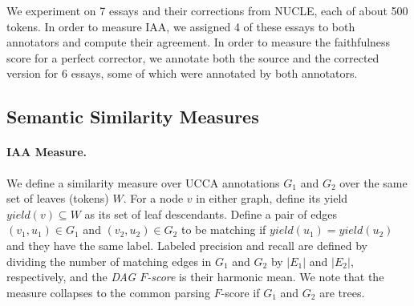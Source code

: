 \documentclass[letterpaper, 11pt]{article}
\begin{document}
We experiment on 7 essays and their corrections from NUCLE, each of about 500 tokens.
In order to measure IAA, we assigned 4 of these essays to both annotators
and compute their agreement.
In order to measure the faithfulness score for a perfect corrector, we annotate both
the source and the corrected version for 6 essays, some of which were annotated by both annotators.
%
%
%
%
%
\subsection{Semantic Similarity Measures}
\paragraph{IAA Measure.} We define a similarity measure over UCCA annotations 
$G_1$ and $G_2$ over the same set of leaves (tokens) $W$.
For a node $v$ in either graph, define its yield $yield(v) \subseteq W$ as its
set of leaf descendants.
Define a pair of edges $(v_1,u_1) \in G_1$ and $(v_2,u_2) \in G_2$ to be matching
if $yield(u_1) = yield(u_2)$ and they have the same label.
Labeled precision and recall are defined by dividing the number of matching edges
in $G_1$ and $G_2$ by $|E_1|$ and $|E_2|$, respectively, and
the {\it DAG $F$-score} is their harmonic mean.
We note that the measure collapses to the common parsing $F$-score if $G_1$ and $G_2$ are trees.
\end{document}
